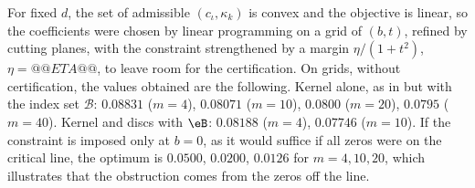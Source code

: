 \begin{remark}\label{rem:lp}
For fixed $d$, the set of admissible $(c_\iota,\kappa_k)$ is convex and the objective  is linear, so the coefficients were chosen by linear programming on a grid of $(b,t)$, refined by cutting planes, with the constraint strengthened by a margin $\eta/(1+t^2)$, $\eta=@@ETA@@$, to leave room for the certification. On grids, without certification, the values obtained are the following. Kernel alone, as in \cite{BellottiWong2026} but with the index set $\mathcal B$: $0.08831$ ($m=4$), $0.08071$ ($m=10$), $0.0800$ ($m=20$), $0.0795$ ($m=40$). Kernel and discs with $\eB$: $0.08188$ ($m=4$), $0.07746$ ($m=10$). If the constraint is imposed only at $b=0$, as it would suffice if all zeros were on the critical line, the optimum is $0.0500$, $0.0200$, $0.0126$ for $m=4,10,20$, which illustrates that the obstruction comes from the zeros off the line.
\end{remark}
